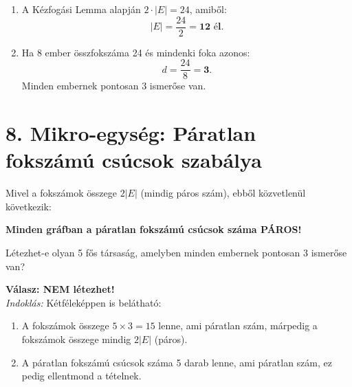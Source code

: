 \documentclass[a4paper,12pt]{article}
\begin{document}
\begin{megoldasdoboz}
\begin{enumerate}[label=\alph*)]
    \item A Kézfogási Lemma alapján $2 \cdot |E| = 24$, amiből:
    \[
        |E| = \frac{24}{2} = \mathbf{12\text{ él}}.
    \]
    \item Ha 8 ember összfokszáma 24 és mindenki foka azonos:
    \[
        d = \frac{24}{8} = \mathbf{3}.
    \]
    Minden embernek pontosan 3 ismerőse van.
\end{enumerate}
\end{megoldasdoboz}

\vspace{0.4cm}
\section{8. Mikro-egység: Páratlan fokszámú csúcsok szabálya}

\begin{teteldoboz}
Mivel a fokszámok összege $2|E|$ (mindig páros szám), ebből közvetlenül következik:
\begin{center}
    \textbf{Minden gráfban a páratlan fokszámú csúcsok száma PÁROS!}
\end{center}
\end{teteldoboz}

\begin{feladatdoboz}
Létezhet-e olyan 5 fős társaság, amelyben minden embernek pontosan 3 ismerőse van?
\end{feladatdoboz}

\begin{megoldasdoboz}
\textbf{Válasz: NEM létezhet!} \\
\textit{Indoklás:} Kétféleképpen is belátható:
\begin{enumerate}
    \item A fokszámok összege $5 \times 3 = 15$ lenne, ami páratlan szám, márpedig a fokszámok összege mindig $2|E|$ (páros).
    \item A páratlan fokszámú csúcsok száma 5 darab lenne, ami páratlan szám, ez pedig ellentmond a tételnek.
\end{enumerate}
\end{megoldasdoboz}
\end{document}
